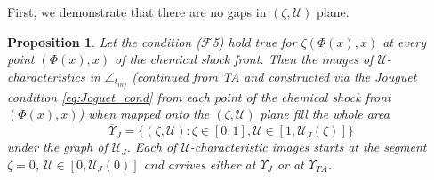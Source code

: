 \documentclass[12pt]{article}
\newtheorem{proposition}{Proposition}
\theoremstyle{definition}
\begin{document}
First, we demonstrate that there are no gaps in $(\zeta, \mathcal U)$ plane.
\begin{proposition}
\label{prop:full_cover_of_zeta_U_plane}
Let the condition ($\mathcal F$5) hold true for $\zeta(\Phi(x), x)$ at every point $(\Phi(x), x)$  of the chemical shock front. Then the images of $\mathcal U$-characteristics in $\angle_{t_{inj}}$ (continued from TA and constructed via the Jouguet condition \eqref{eq:Joguet_cond} from each point of the chemical shock front $(\Phi(x),x)$) when mapped onto the $(\zeta, \mathcal U)$ plane fill the whole area
$$\overline {\Upsilon}_J = \{(\zeta, \mathcal U): \zeta\in[0,1], \mathcal U \in [1, \mathcal U_J(\zeta)]\}$$
under the graph of $\mathcal U_J$.
Each of $\mathcal U$-characteristic images starts at the segment $\zeta = 0$, $\mathcal U \in [0,\mathcal U_J(0)]$ and arrives either at $\Upsilon_J$ or at $\Upsilon_{TA}$.    
\end{proposition}
\end{document}

